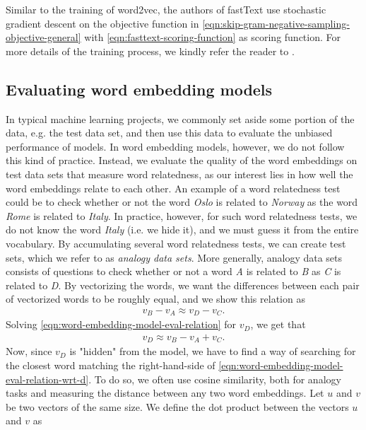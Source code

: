 Similar to the training of word2vec, the authors of fastText use stochastic gradient descent on the objective function in \cref{eqn:skip-gram-negative-sampling-objective-general} with \cref{eqn:fasttext-scoring-function} as scoring function. For more details of the training process, we kindly refer the reader to \cite[p. 3-4]{bojanowski2017enriching}.

\subsection{Evaluating word embedding models}
\label{sec:eval-word-embedding-models}
In typical machine learning projects, we commonly set aside some portion of the data, e.g. the test data set, and then use this data to evaluate the unbiased performance of models. In word embedding models, however, we do not follow this kind of practice. Instead, we evaluate the quality of the word embeddings on test data sets that measure word relatedness, as our interest lies in how well the word embeddings relate to each other. An example of a word relatedness test could be to check whether or not the word \textit{Oslo} is related to \textit{Norway} as the word \textit{Rome} is related to \textit{Italy}. In practice, however, for such word relatedness tests, we do not know the word \textit{Italy} (i.e. we hide it), and we must guess it from the entire vocabulary. By accumulating several word relatedness tests, we can create test sets, which we refer to as \textit{analogy data sets}. More generally, analogy data sets consists of questions to check whether or not a word \textit{A} is related to \textit{B} as \textit{C} is related to \textit{D}. By vectorizing the words, we want the differences between each pair of vectorized words to be roughly equal, and we show this relation as
\begin{align}
    v_{\textit{B}} - v_{\textit{A}} \approx v_{\textit{D}} - v_{\textit{C}}.
    \label{eqn:word-embedding-model-eval-relation}
\end{align}
Solving \cref{eqn:word-embedding-model-eval-relation} for $v_{\textit{D}}$, we get that
\begin{align}
    v_{\textit{D}} \approx v_{\textit{B}} - v_{\textit{A}} + v_{\textit{C}}.
    \label{eqn:word-embedding-model-eval-relation-wrt-d}
\end{align}
Now, since $v_{\textit{D}}$ is "hidden" from the model, we have to find a way of searching for the closest word matching the right-hand-side of \cref{eqn:word-embedding-model-eval-relation-wrt-d}. To do so, we often use cosine similarity, both for analogy tasks and measuring the distance between any two word embeddings. Let $u$ and $v$ be two vectors of the same size. We define the dot product between the vectors $u$ and $v$ as
